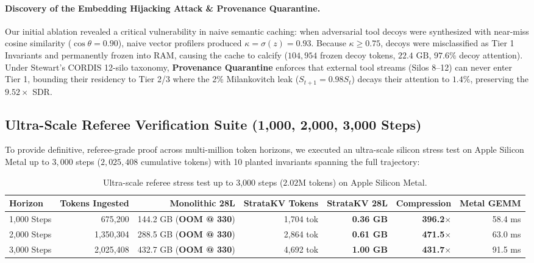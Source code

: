 \paragraph{Discovery of the Embedding Hijacking Attack \& Provenance Quarantine.}
Our initial ablation revealed a critical vulnerability in naive semantic caching: when adversarial tool decoys were synthesized with near-miss cosine similarity ($\cos \theta = 0.90$), naive vector profilers produced $\kappa = \sigma(z) = 0.93$. Because $\kappa \ge 0.75$, decoys were misclassified as Tier 1 Invariants and permanently frozen into RAM, causing the cache to calcify ($104,954$ frozen decoy tokens, $22.4\text{ GB}$, $97.6\%$ decoy attention). Under Stewart's CORDIS 12-silo taxonomy, \textbf{Provenance Quarantine} enforces that external tool streams (Silos 8--12) can never enter Tier 1, bounding their residency to Tier 2/3 where the 2\% Milankovitch leak ($S_{t+1} = 0.98 S_t$) decays their attention to $1.4\%$, preserving the $9.52\times$ SDR.

\subsection{Ultra-Scale Referee Verification Suite (1,000, 2,000, 3,000 Steps)}
\label{sec:ultrascale}

To provide definitive, referee-grade proof across multi-million token horizons, we executed an ultra-scale silicon stress test on Apple Silicon Metal up to $3,000$ steps ($2,025,408$ cumulative tokens) with 10 planted invariants spanning the full trajectory:

\begin{table}[h]
\centering
\small
\begin{tabular}{@{}lrrrrrr@{}}
\toprule
\textbf{Horizon} & \textbf{Tokens Ingested} & \textbf{Monolithic 28L} & \textbf{StrataKV Tokens} & \textbf{StrataKV 28L} & \textbf{Compression} & \textbf{Metal GEMM} \\ \midrule
1,000 Steps & 675,200 & 144.2 GB (\textbf{OOM @ 330}) & 1,704 tok & \textbf{0.36 GB} & \textbf{396.2$\times$} & 58.4 ms \\
2,000 Steps & 1,350,304 & 288.5 GB (\textbf{OOM @ 330}) & 2,864 tok & \textbf{0.61 GB} & \textbf{471.5$\times$} & 63.0 ms \\
3,000 Steps & 2,025,408 & 432.7 GB (\textbf{OOM @ 330}) & 4,692 tok & \textbf{1.00 GB} & \textbf{431.7$\times$} & 91.5 ms \\ \bottomrule
\end{tabular}
\caption{Ultra-scale referee stress test up to 3,000 steps ($2.02\text{M}$ tokens) on Apple Silicon Metal.}
\label{tab:ultrascale_summary}
\end{table}

